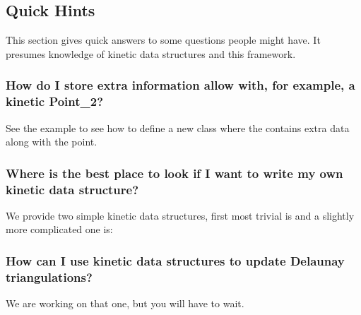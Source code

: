 \subsection{Quick Hints \label{sec:quick_hints}}

This section gives quick answers to some questions people might have.
It presumes knowledge of kinetic data structures and this framework.

\subsubsection{How do I store extra information allow with, for example, a kinetic Point\_2?}

See the example
 to see how
to define a new  class where the
 contains extra data along with the point.

\subsubsection{Where is the best place to look if I want to write my own kinetic data structure?}
We provide two simple kinetic data structures, first most trivial is
 and a slightly more
complicated one is:


\subsubsection{How can I use kinetic data structures to update Delaunay triangulations?}
We are working on that one, but you will have to wait.



